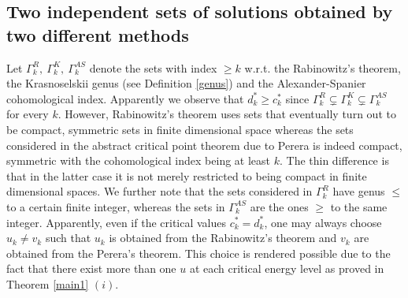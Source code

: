 \documentclass[12pt]{extarticle}
\theoremstyle{definition}
\theoremstyle{remark}
\theoremstyle{definition}
\numberwithin{equation}{section}
\numberwithin{equation}{section}
\begin{document}
\subsection{Two independent sets of solutions obtained by two different methods}
Let $\Gamma_k^{R},~\Gamma_k^{K},~\Gamma_k^{AS}$ denote the sets with index $\geq k$ w.r.t. the Rabinowitz's theorem, the Krasnoselskii genus (see Definition \ref{genus}) and the Alexander-Spanier cohomological index. Apparently we observe that $d_k^*\geq c_k^*$ since $\Gamma_k^{R}\subsetneq\Gamma_k^{K}\subsetneq \Gamma_k^{AS}$ for every $k$. However, Rabinowitz's theorem uses sets that eventually turn out to be compact, symmetric sets in finite dimensional space whereas the sets considered in the abstract critical point theorem due to Perera \cite{perera2} is indeed compact, symmetric with the cohomological index being at least $k$. The thin difference is that in the latter case it is not merely restricted to being compact in finite dimensional spaces. We further note that the sets considered in $\Gamma_k^{R}$ have genus $\leq$ to a certain finite integer, whereas the sets in $\Gamma_k^{AS}$ are the ones $\geq$ to the same integer. Apparently, even if the critical values $c_k^*=d_k^*$, one may always choose $u_k\neq v_k$ such that  $u_k$ is obtained from the Rabinowitz's theorem and $v_k$ are obtained from the Perera's theorem.  This choice is rendered possible due to the fact that there exist more than one $u$ at each critical energy level as proved in Theorem \ref{main1} $(i)$.

\end{document}
